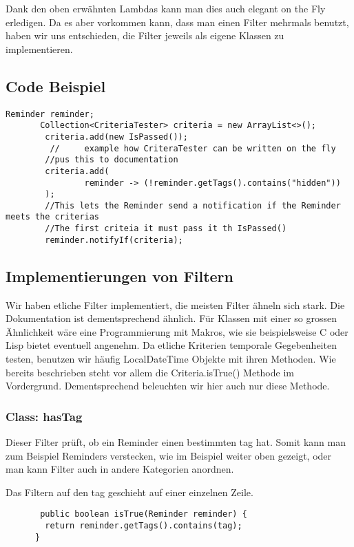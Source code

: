   Dank den oben erwähnten Lambdas kann man dies auch elegant on the Fly erledigen. Da es aber vorkommen kann, dass man einen Filter mehrmals benutzt, haben wir uns entschieden,
  die Filter jeweils als eigene Klassen zu implementieren.

  \subsection{Code Beispiel}
       \begin{lstlisting}[caption = on the fly criteria]
       Reminder reminder;
       Collection<CriteriaTester> criteria = new ArrayList<>();
        criteria.add(new IsPassed());
         //     example how CriteraTester can be written on the fly
        //pus this to documentation
        criteria.add(
                reminder -> (!reminder.getTags().contains("hidden"))
        );
        //This lets the Reminder send a notification if the Reminder meets the criterias
        //The first criteia it must pass it th IsPassed()
        reminder.notifyIf(criteria);
       \end{lstlisting}


       \subsection{Implementierungen von Filtern}
       Wir haben etliche Filter implementiert, die meisten Filter ähneln sich stark. Die Dokumentation ist dementsprechend ähnlich.
       Für Klassen mit einer so grossen Ähnlichkeit wäre eine Programmierung mit Makros, wie sie beispielsweise C oder Lisp bietet eventuell angenehm. Da etliche Kriterien
       temporale Gegebenheiten testen, benutzen wir häufig LocalDateTime Objekte mit ihren Methoden.
       Wie bereits beschrieben steht vor allem die Criteria.isTrue() Methode im Vordergrund. Dementsprechend beleuchten wir hier auch nur diese Methode.

       \subsubsection{Class: hasTag}
       Dieser Filter prüft, ob ein Reminder einen bestimmten tag hat. Somit kann man zum Beispiel Reminders verstecken, wie im Beispiel weiter oben gezeigt,
       oder man kann Filter auch in andere Kategorien anordnen.

       Das Filtern auf den tag geschieht auf einer einzelnen Zeile.
      \begin{lstlisting}
       public boolean isTrue(Reminder reminder) {
	    return reminder.getTags().contains(tag);
      }
      \end{lstlisting}

